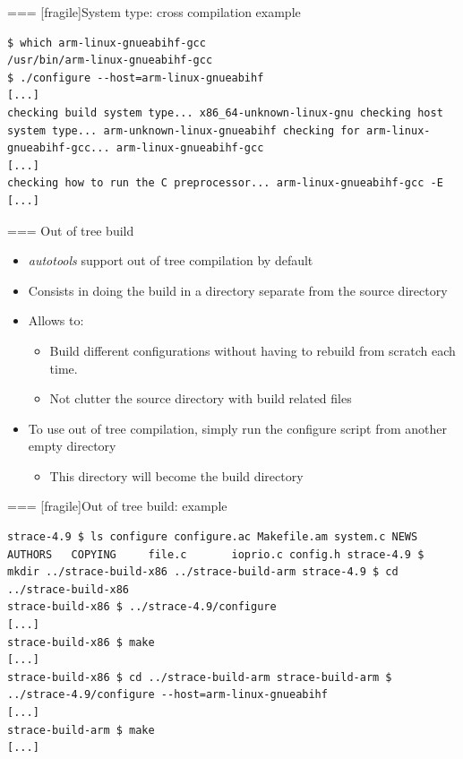 === [fragile]{System type: cross compilation example}

\begin{block}{}
{\scriptsize
\begin{verbatim}
$ which arm-linux-gnueabihf-gcc
/usr/bin/arm-linux-gnueabihf-gcc
$ ./configure --host=arm-linux-gnueabihf
[...]
checking build system type... x86_64-unknown-linux-gnu checking host system type... arm-unknown-linux-gnueabihf checking for arm-linux-gnueabihf-gcc... arm-linux-gnueabihf-gcc
[...]
checking how to run the C preprocessor... arm-linux-gnueabihf-gcc -E
[...]
\end{verbatim}}
\end{block}



=== {Out of tree build}
  \begin{itemize}
  \item {\em autotools} support out of tree compilation by default
  \item Consists in doing the build in a directory separate from the
    source directory
  \item Allows to:
    \begin{itemize}
    \item Build different configurations without having to rebuild
      from scratch each time.
    \item Not clutter the source directory with build related files
    \end{itemize}
  \item To use out of tree compilation, simply run the configure
    script from another empty directory
    \begin{itemize}
    \item This directory will become the build directory
    \end{itemize}
  \end{itemize}


=== [fragile]{Out of tree build: example}

  \begin{block}{}
{\scriptsize
\begin{verbatim}
strace-4.9 $ ls configure configure.ac Makefile.am system.c NEWS
AUTHORS   COPYING     file.c       ioprio.c config.h strace-4.9 $ mkdir ../strace-build-x86 ../strace-build-arm strace-4.9 $ cd ../strace-build-x86
strace-build-x86 $ ../strace-4.9/configure
[...]
strace-build-x86 $ make
[...]
strace-build-x86 $ cd ../strace-build-arm strace-build-arm $ ../strace-4.9/configure --host=arm-linux-gnueabihf
[...]
strace-build-arm $ make
[...]
\end{verbatim}}
\end{block}



